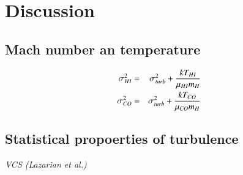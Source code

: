 \documentclass[traditabstract]{aa}
\begin{document}
%
%
%




\section{Discussion}
\label{sec:discussion}

   \subsection{Mach number an temperature}

\begin{eqnarray}
  \sigma_{H\rmnum{1}}^2 &=& \sigma_{turb}^2+\frac{k T_{H\rmnum{1}}}{\mu_{H\rmnum{1}} m_H} \\
  \sigma_{CO}^2         &=& \sigma_{turb}^2+\frac{k T_{CO}}{\mu_{CO} m_H}
\end{eqnarray}


   \subsection{Statistical propoerties of turbulence}

\textit{VCS (Lazarian et al.)}
\end{document}

